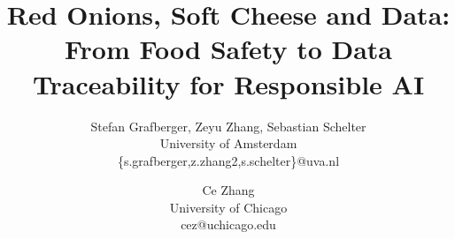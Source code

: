 \documentclass[11pt]{article}
\begin{document}
\title{Red Onions, Soft Cheese and Data: \\From Food Safety to Data Traceability for Responsible AI}

\author{
Stefan Grafberger, Zeyu Zhang, Sebastian Schelter\\
University of Amsterdam\\
\{s.grafberger,z.zhang2,s.schelter\}@uva.nl
\and
Ce Zhang\\
University of Chicago\\
cez@uchicago.edu}

\maketitle










\newpage


\end{document}
